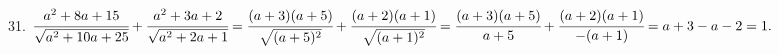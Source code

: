 31. $\cfrac{a^2+8a+15}{\sqrt{a^2+10a+25}}+\cfrac{a^2+3a+2}{\sqrt{a^2+2a+1}}=\cfrac{(a+3)(a+5)}{\sqrt{(a+5)^2}}+\cfrac{(a+2)(a+1)}{\sqrt{(a+1)^2}}=
\cfrac{(a+3)(a+5)}{a+5}+\cfrac{(a+2)(a+1)}{-(a+1)}=a+3-a-2=1.$\\
